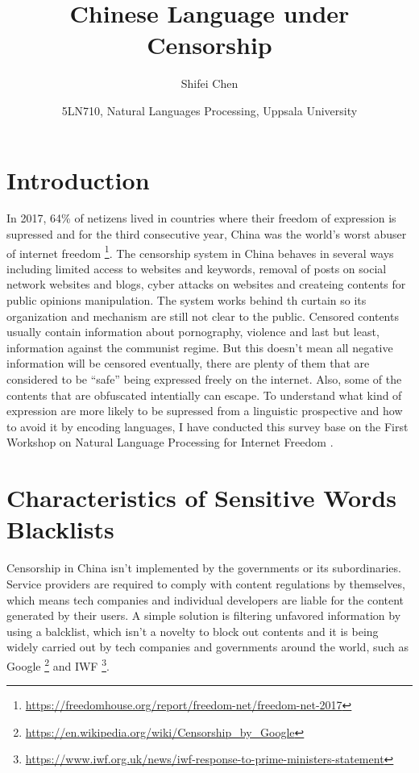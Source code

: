 \documentclass[11pt]{article} %
\title{{\LARGE Chinese Language under Censorship}\\[1.5mm]} %
\author{Shifei Chen\\} %
\date{5LN710, Natural Languages Processing, Uppsala University}
\begin{document}
\maketitle

\section{Introduction}

In 2017, 64\% of netizens lived in countries where their freedom of expression is supressed and for the third consecutive year, China was the world's worst abuser of internet freedom \footnote{\url{https://freedomhouse.org/report/freedom-net/freedom-net-2017}}. The censorship system in China behaves in several ways including limited access to websites and keywords, removal of posts on social network websites and blogs, cyber attacks on websites and createing contents for public opinions manipulation. The system works behind th curtain so its organization and mechanism are still not clear to the public. Censored contents usually contain information about pornography, violence and last but least, information against the communist regime. But this doesn't mean all negative information will be censored eventually, there are plenty of them that are considered to be ``safe'' being expressed freely on the internet. Also, some of the contents that are obfuscated intentially can escape. To understand what kind of expression are more likely to be supressed from a linguistic prospective and how to avoid it by encoding languages, I have conducted this survey base on the First Workshop on Natural Language Processing for Internet Freedom \cite{brew2018proceedings}.

\section{Characteristics of Sensitive Words Blacklists}

Censorship in China isn't implemented by the governments or its subordinaries. Service providers are required to comply with content regulations by themselves, which means tech companies and individual developers are liable for the content generated by their users. A simple solution is filtering unfavored information by using a balcklist, which isn't a novelty to block out contents and it is being widely carried out by tech companies and governments around the world, such as Google \footnote{\url{https://en.wikipedia.org/wiki/Censorship_by_Google}} and IWF \footnote{\url{https://www.iwf.org.uk/news/iwf-response-to-prime-ministers-statement}}.
\end{document}
